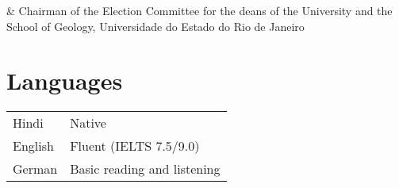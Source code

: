 \documentclass[11pt, a4paper]{article}
\newcommand{\TablePad}{\vspace{-0.4cm}}
\newcommand{\Year}[1]{\fontsize{10pt}{0}\selectfont #1}
\begin{document}
\begin{EntriesTable}
    \Year{2015} & Chairman of the Election Committee for the deans of the
    University and the School of Geology, Universidade do Estado do Rio de
    Janeiro
\end{EntriesTable}
\fi

\iffalse

\subsection*{Reviewer}

Geophysical Journal International
--
Journal of Geodesy
--
Pure and Applied Geophysics
--
Journal of Applied Geophysics
--
Geophysical Prospecting
--
Geophysics
--
Central European Journal of Geosciences
--
Computers \& Geosciences

\fi
\iffalse

\subsection*{Affiliations}

American Geophysical Union
--
Society of Exploration Geophysicists
--
Geological Society of America

\fi

\section*{Languages}

\TablePad
\begin{tabularx}{\textwidth}{@{}p{} p{}@{}}
    Hindi & Native
    \\
    English & Fluent (IELTS 7.5/9.0)
    \\
    German & Basic reading and listening
\end{tabularx}
\end{document}
